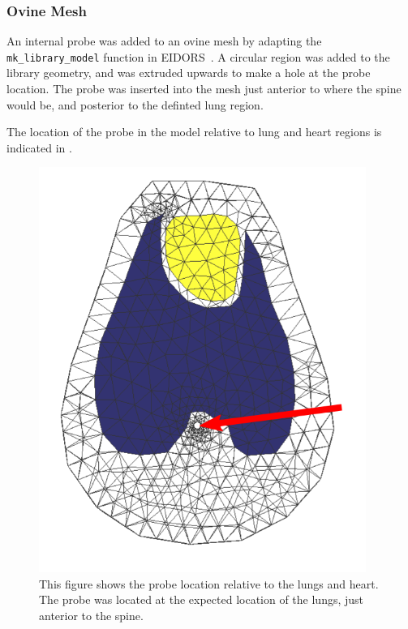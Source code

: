 \subsubsection{Ovine Mesh}
An internal probe was added to an ovine mesh by adapting the 
\verb!mk_library_model!
function in EIDORS~\parencite{adler_eidors_2017}. A circular region was added to the
library geometry, and was extruded upwards to make a hole at the probe location. 
The probe was inserted into the mesh just anterior to where the spine would be,
and posterior to the definted lung region. 

The location of the probe in the model relative to lung and heart 
regions is indicated in . 
\begin{figure}
    \centering
	\includegraphics[width=0.95\textwidth]{chapter7-internal_elec_motion/imgs/internal_probe_location.png} 
	\caption[Ovine mesh with organ regions and probe placement]{\label{fig:ovine_anatomy} 
	This figure shows the probe location relative to the lungs and heart. The probe was located 
	at the expected location of the lungs, just anterior to the spine. }
\end{figure}

